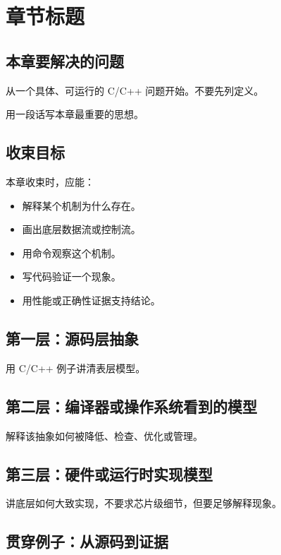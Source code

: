 \chapter{章节标题}

\section{本章要解决的问题}

从一个具体、可运行的 C/C++ 问题开始。不要先列定义。

\begin{keyidea}
用一段话写本章最重要的思想。
\end{keyidea}

\section{收束目标}

本章收束时，应能：

\begin{itemize}
  \item 解释某个机制为什么存在。
  \item 画出底层数据流或控制流。
  \item 用命令观察这个机制。
  \item 写代码验证一个现象。
  \item 用性能或正确性证据支持结论。
\end{itemize}

\section{第一层：源码层抽象}

用 C/C++ 例子讲清表层模型。

\section{第二层：编译器或操作系统看到的模型}

解释该抽象如何被降低、检查、优化或管理。

\section{第三层：硬件或运行时实现模型}

讲底层如何大致实现，不要求芯片级细节，但要足够解释现象。

\section{贯穿例子：从源码到证据}

